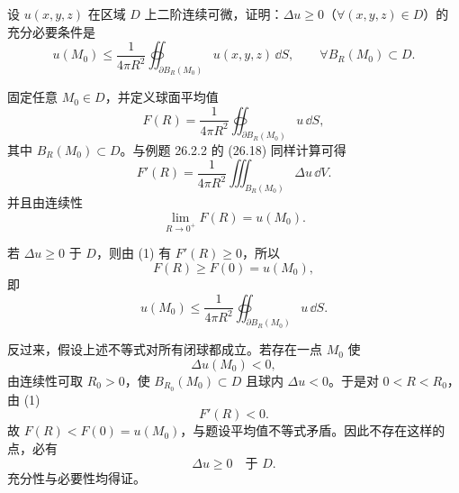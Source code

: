 \begin{xreferenceproblem}[3]
设 $u(x,y,z)$ 在区域 $D$ 上二阶连续可微，证明：$\Delta u\ge0$（$\forall(x,y,z)\in D$）的充分必要条件是
\[
  u(M_0)\le\frac{1}{4\pi R^2}\oiint_{\partial B_R(M_0)}u(x,y,z)\,\dd S,
  \qquad \forall B_R(M_0)\subset D.
\]
\end{xreferenceproblem}
\begin{xsolution}
固定任意 $M_0\in D$，并定义球面平均值
\[
  F(R)=\frac{1}{4\pi R^2}\oiint_{\partial B_R(M_0)}u\,\dd S,
\]
其中 $B_R(M_0)\subset D$。与例题 26.2.2 的 (26.18) 同样计算可得
\begin{equation}
  F'(R)=\frac{1}{4\pi R^2}\iiint_{B_R(M_0)}\Delta u\,\dd V.
  \tag{1}
\end{equation}
并且由连续性
\[
  \lim_{R\to0^+}F(R)=u(M_0).
\]

若 $\Delta u\ge0$ 于 $D$，则由 (1) 有 $F'(R)\ge0$，所以
\[
  F(R)\ge F(0)=u(M_0),
\]
即
\[
  u(M_0)\le\frac{1}{4\pi R^2}
  \oiint_{\partial B_R(M_0)}u\,\dd S.
\]

反过来，假设上述不等式对所有闭球都成立。若存在一点 $M_0$ 使
\[
  \Delta u(M_0)<0,
\]
由连续性可取 $R_0>0$，使 $B_{R_0}(M_0)\subset D$ 且球内 $\Delta u<0$。于是对 $0<R<R_0$，由 (1)
\[
  F'(R)<0.
\]
故 $F(R)<F(0)=u(M_0)$，与题设平均值不等式矛盾。因此不存在这样的点，必有
\[
  \Delta u\ge0\quad\text{于 }D.
\]
充分性与必要性均得证。
\end{xsolution}


